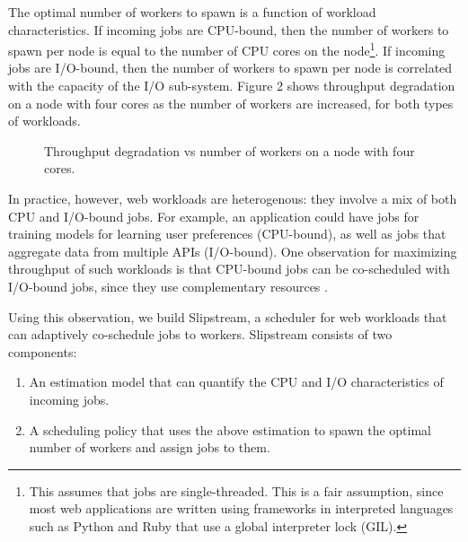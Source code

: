 \documentclass{proc}
\begin{document}
The optimal number of workers to spawn is a function of workload
characteristics. If incoming jobs are CPU-bound, then the number of workers to
spawn per node is equal to the number of CPU cores on the node\footnote{This
assumes that jobs are single-threaded. This is a fair assumption, since most web
applications are written using frameworks in interpreted languages such as
Python and Ruby that use a global interpreter lock (GIL).}. If incoming jobs are
I/O-bound, then the number of workers to spawn per node is correlated with the
capacity of the I/O sub-system. Figure 2 shows throughput degradation on a node
with four cores as the number of workers are increased, for both types of
workloads.

\begin{figure}
  \centering
  \qquad
  \caption{Throughput degradation vs number of workers on a node with four cores.}%
  \label{fig:example}%
\end{figure}

In practice, however, web workloads are heterogenous: they involve a mix of both
CPU and I/O-bound jobs. For example, an application could have jobs for training
models for learning user preferences (CPU-bound), as well as jobs that aggregate
data from multiple APIs (I/O-bound). One observation for maximizing throughput
of such workloads is that CPU-bound jobs can be co-scheduled with I/O-bound
jobs, since they use complementary resources \cite{10.1109/TPDS.2003.1206505}.

Using this observation, we build Slipstream, a scheduler for web workloads that
can adaptively co-schedule jobs to workers. Slipstream consists of two
components:
\begin{enumerate}
  \item An estimation model that can quantify the CPU and I/O characteristics of
  incoming jobs.
  \item A scheduling policy that uses the above estimation to spawn the optimal
  number of workers and assign jobs to them.
\end{enumerate}
\end{document}
